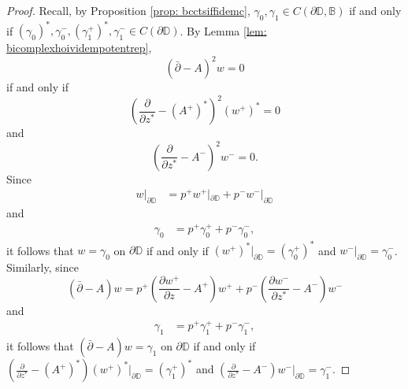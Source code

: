 \documentclass[12pt,reqno]{amsart}
\theoremstyle{definition}
\theoremstyle{remark}
\newcommand{\p}{\partial}
\newcommand{\dbar}{\bar\partial}
\newcommand{\bc}{\mathbb{B}}
\newcommand{\disk}{\mathbb{D}}
\begin{document}
            \begin{proof}
                Recall, by Proposition \ref{prop: bcctsiffidemc}, $\gamma_0,\gamma_1 \in C(\p\disk,\bc)$ if and only if $(\gamma_0)^*, \gamma_0^-, (\gamma_1^+)^*, \gamma_1^- \in C(\p\disk)$. By Lemma \ref{lem: bicomplexhoividempotentrep}, 
                \[
                    (\dbar - A)^2 w = 0
                \]
                if and only if 
                \[
                     \left( \frac{\p}{\p z^*} - (A^+)^*\right)^2 (w^+)^* = 0
                \]
                and 
                \[
                     \left( \frac{\p}{\p z^*} - A^-\right)^2 w^- = 0.
                \]
                Since 
                \begin{align*}
                    w|_{\p\disk} &= p^+ w^+|_{\p\disk} + p^- w^-|_{\p\disk} 
                \end{align*}
                and
                \begin{align*}
                    \gamma_0 &= p^+ \gamma_0^+ + p^- \gamma_0^-,
                \end{align*}
                it follows that $w= \gamma_0$ on $\p\disk$ if and only if $(w^+)^*|_{\p\disk} = (\gamma_0^+)^*$ and $w^-|_{\p\disk} = \gamma_0^-$. Similarly, since 
                \[
                    (\dbar - A) w = p^+ \left(\frac{\p w^+}{\p z}-A^+\right)w^+ + p^- \left(\frac{\p w^-}{\p z^*}-A^-\right) w^-
                \]
                and 
                \begin{align*}
                    \gamma_1 &= p^+ \gamma_1^+ + p^- \gamma_1^-,
                \end{align*}
                it follows that $(\dbar-A) w = \gamma_1$ on $\p\disk$ if and only if $\left(\frac{\p }{\p z^*} -(A^+)^*\right) (w^+)^*|_{\p\disk}= (\gamma_1^+)^*$ and $\left(\frac{\p }{\p z^*}-A^-\right)w^-|_{\p\disk} = \gamma_1^-$. 

            \end{proof}
\end{document}
